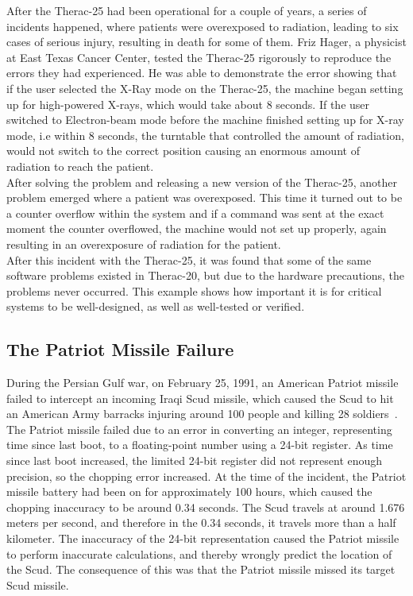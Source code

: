 After the Therac-25 had been operational for a couple of years, a series of incidents happened, where patients were overexposed to radiation, leading to six cases of serious injury, resulting in death for some of them. Friz Hager, a physicist at East Texas Cancer Center, tested the Therac-25 rigorously to reproduce the errors they had experienced. He was able to demonstrate the error showing that if the user selected the X-Ray mode on the Therac-25, the machine began setting up for high-powered X-rays, which would take about 8 seconds. If the user switched to Electron-beam mode before the machine finished setting up for X-ray mode, i.e within 8 seconds, the turntable that controlled the amount of radiation, would not switch to the correct position causing an enormous amount of radiation to reach the patient.\\

After solving the problem and releasing a new version of the Therac-25, another problem emerged where a patient was overexposed. This time it turned out to be a counter overflow within the system and if a command was sent at the exact moment the counter overflowed, the machine would not set up properly, again resulting in an overexposure of radiation for the patient. \\

After this incident with the Therac-25, it was found that some of the same software problems existed in Therac-20, but due to the hardware precautions, the problems never occurred.
This example shows how important it is for critical systems to be well-designed, as well as well-tested or verified.

\subsection{The Patriot Missile Failure}
During the Persian Gulf war, on February 25, 1991, an American Patriot missile failed to intercept an incoming Iraqi Scud missile, which caused the Scud to hit an American Army barracks injuring around 100 people and killing 28 soldiers~\cite{patriot1991}.\\

The Patriot missile failed due to an error in converting an integer, representing time since last boot, to a floating-point number using a 24-bit register. As time since last boot increased, the limited 24-bit register did not represent enough precision, so the chopping error increased. At the time of the incident, the Patriot missile battery had been on for approximately 100 hours, which caused the chopping inaccuracy to be around 0.34 seconds. The Scud travels at around 1.676 meters per second, and therefore in the 0.34 seconds, it travels more than a half kilometer.
The inaccuracy of the 24-bit representation caused the Patriot missile to perform inaccurate calculations, and thereby wrongly predict the location of the Scud. The consequence of this was that the Patriot missile missed its target Scud missile.\\


